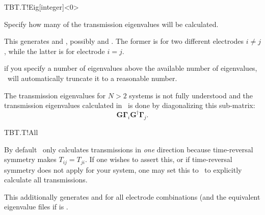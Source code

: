 \begin{fdfentry}{TBT.T!Eig}[integer]<0>

  Specify how many of the transmission eigenvalues will be
  calculated. 

  This generates  and
  , possibly  and
  . The former is for two different electrodes
  $i\neq j$, while the latter is for electrode $i=j$.
  
  \note if you specify a number of eigenvalues above the available
  number of eigenvalues, \tbtrans\ will automatically truncate it to a
  reasonable number.

  \note The transmission eigenvalues for $N>2$ systems is not fully
  understood and the transmission eigenvalues calculated in \tbtrans\ is
  done by diagonalizing this sub-matrix:
  \begin{equation}
    \mathbf G \boldsymbol \Gamma_i \mathbf G^\dagger \boldsymbol \Gamma_j.
  \end{equation}

\end{fdfentry}

\begin{fdflogicalF}{TBT.T!All}

  By default \tbtrans\ only calculates transmissions in \emph{one}
  direction because time-reversal symmetry makes $T_{ij}=T_{ji}$. If
  one wishes to assert this, or if time-reversal symmetry does not
  apply for your system, one may set this to \fdftrue\ to explicitly
  calculate all transmissions.

  This additionally generates  and
   for all electrode combinations (and the
  equivalent eigenvalue files if  is \fdftrue.

\end{fdflogicalF}

